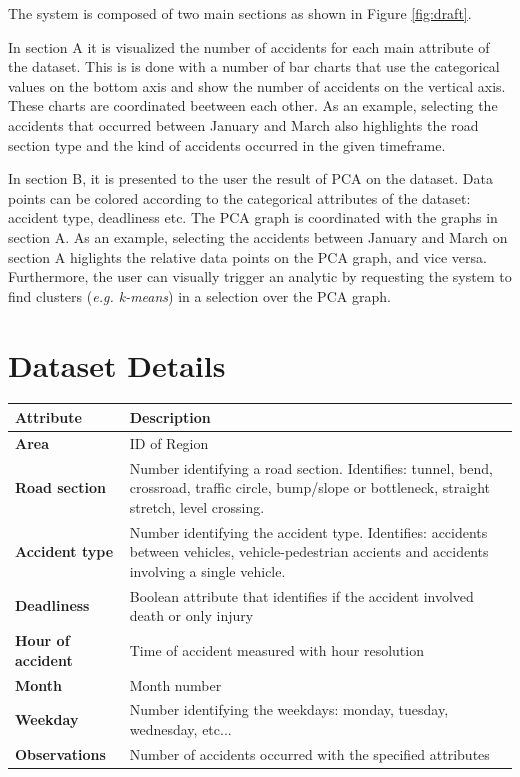 \documentclass[12pt]{article}
\begin{document}
The system is composed of two main sections as shown in Figure \ref{fig:draft}.

In section A it is visualized the number of accidents for each main attribute
of the dataset. This is is done with a number of bar charts that use the
categorical values on the bottom axis and show the number of accidents on the
vertical axis. These charts are coordinated beetween each other. 
As an example, selecting the accidents that occurred between January and March
also highlights the road section type and the kind of accidents occurred in the
given timeframe.

In section B, it is presented to the user the result of PCA on the dataset.
Data points can be colored according to the categorical attributes of the dataset:
accident type, deadliness etc.
The PCA graph is coordinated with the graphs in section A.
As an example, selecting the accidents between January and March on section A higlights
the relative data points on the PCA graph, and vice versa.
Furthermore, the user can visually trigger an analytic by requesting the system
to find clusters (\textit{e.g. k-means}) in a selection over the PCA graph.

\section{Dataset Details}

\begin{tabularx}{\textwidth} {| >{\bfseries}l | X |} 

\hline
Attribute & \textbf{Description} \\
\hline\hline

Area & ID of Region \\
\hline
Road section & Number identifying a road section. Identifies: tunnel, bend, crossroad, traffic circle, bump/slope or bottleneck, straight stretch, level crossing. \\
\hline
Accident type &  Number identifying the accident type. Identifies:
accidents between vehicles, vehicle-pedestrian accients and accidents involving
a single vehicle. \\ 
\hline
Deadliness &  Boolean attribute that identifies if the accident involved death or only injury \\
\hline
Hour of accident &  Time of accident measured with hour resolution \\
\hline
Month &  Month number \\
\hline
Weekday & Number identifying the weekdays: monday, tuesday, wednesday, etc...\\
\hline
Observations &  Number of accidents occurred with the specified attributes \\
\hline
\end{tabularx}
\end{document}
